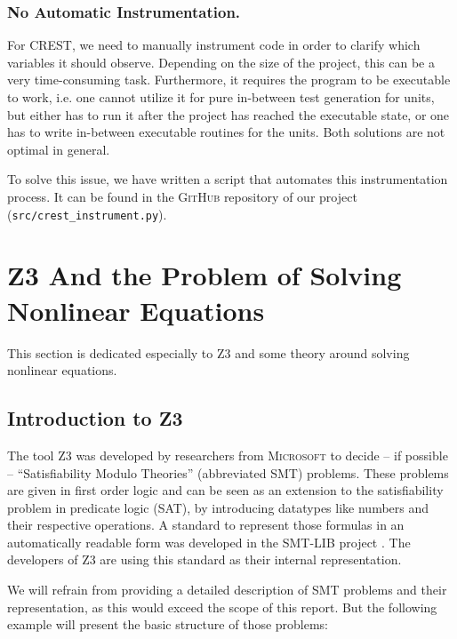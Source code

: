 \documentclass[oribibl]{llncs}
\begin{document}
\subsubsection{No Automatic Instrumentation.}

For \textsc{CREST}, we need to manually instrument code in order to
clarify which variables it should observe. Depending on the size of
the project, this can be a very time-consuming task.  Furthermore, it requires
the program to be executable to work, i.e. one cannot utilize it for
pure in-between test generation for units, but either has to run it after
the project has reached the executable state, or one has to write in-between executable routines for the units. Both solutions are not optimal in general.

To solve this issue, we have written a script that automates this instrumentation process. It can be found in the \textsc{GitHub} repository of our project (\texttt{src/crest\_instrument.py}).





\section{\textsc{Z3} And the Problem of Solving Nonlinear Equations}
\label{sctn:Z3}

This section is dedicated especially to \textsc{Z3} and some theory
around solving nonlinear equations.

\subsection{Introduction to Z3}
The tool \textsc{Z3} \cite{de2008z3}  was developed by researchers from \textsc{Microsoft} to decide -- if
possible -- ``Satisfiability Modulo Theories'' (abbreviated SMT)
problems. These problems are given in first order logic and can be
seen as an extension to the satisfiability problem in predicate logic
(SAT), by introducing datatypes like numbers and their respective
operations. A standard to represent those formulas in an automatically
readable form was developed in the \textsc{SMT-LIB} project  \cite{barrett2010smt}.
The developers of \textsc{Z3} are using this standard as their
internal representation.

We will refrain from providing a detailed description of SMT problems
and their representation, as this would exceed the scope of this
report. But the following example will present the basic structure of
those problems:
\end{document}
